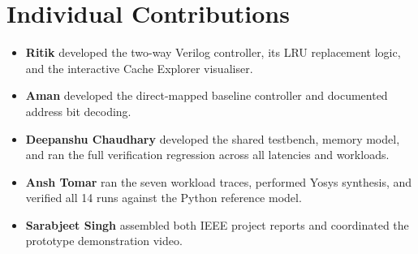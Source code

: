 \section{Individual Contributions}
\begin{itemize}
\item \textbf{Ritik} developed the two-way Verilog controller, its LRU replacement logic, and the interactive Cache Explorer visualiser.
\item \textbf{Aman} developed the direct-mapped baseline controller and documented address bit decoding.
\item \textbf{Deepanshu Chaudhary} developed the shared testbench, memory model, and ran the full verification regression across all latencies and workloads.
\item \textbf{Ansh Tomar} ran the seven workload traces, performed Yosys synthesis, and verified all 14 runs against the Python reference model.
\item \textbf{Sarabjeet Singh} assembled both IEEE project reports and coordinated the prototype demonstration video.
\end{itemize}



